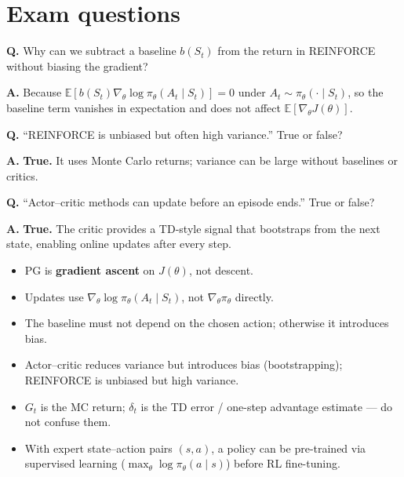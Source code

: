 \documentclass[11pt, oneside]{book}
\newcommand{\E}{\mathbb{E}}
\begin{document}
\section{Exam questions}

\begin{exbox}[title={Exam: Baseline Unbiasedness}]
\textbf{Q.} Why can we subtract a baseline $b(S_t)$ from the return in
REINFORCE without biasing the gradient?

\medskip
\textbf{A.} Because $\E[b(S_t)\nabla_\theta\log\pi_\theta(A_t\mid S_t)] = 0$
under $A_t \sim \pi_\theta(\cdot\mid S_t)$, so the baseline term vanishes in
expectation and does not affect $\E[\nabla_\theta J(\theta)]$.
\end{exbox}

\begin{exbox}[title={Exam: REINFORCE Variance}]
\textbf{Q.} ``REINFORCE is unbiased but often high variance.'' True or false?

\medskip
\textbf{A.} \textbf{True.} It uses Monte Carlo returns; variance can be large
without baselines or critics.
\end{exbox}

\begin{exbox}[title={Exam: Online Actor--Critic}]
\textbf{Q.} ``Actor--critic methods can update before an episode ends.''
True or false?

\medskip
\textbf{A.} \textbf{True.} The critic provides a TD-style signal that
bootstraps from the next state, enabling online updates after every step.
\end{exbox}

\begin{notebox}[title={Common Exam Pitfalls — Policy Gradients}]
\begin{itemize}
  \item PG is \textbf{gradient ascent} on $J(\theta)$, not descent.
  \item Updates use $\nabla_\theta\log\pi_\theta(A_t\mid S_t)$, not
    $\nabla_\theta\pi_\theta$ directly.
  \item The baseline must not depend on the chosen action; otherwise it
    introduces bias.
  \item Actor--critic reduces variance but introduces bias (bootstrapping);
    REINFORCE is unbiased but high variance.
  \item $G_t$ is the MC return; $\delta_t$ is the TD error / one-step
    advantage estimate --- do not confuse them.
  \item With expert state--action pairs $(s,a)$, a policy can be pre-trained
    via supervised learning ($\max_\theta \log\pi_\theta(a\mid s)$) before
    RL fine-tuning.
\end{itemize}
\end{notebox}


\backmatter
\end{document}
